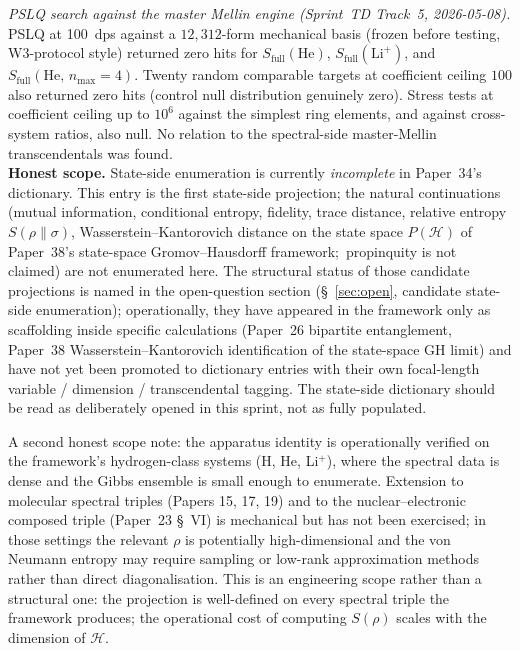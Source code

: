 \documentclass[11pt]{article}
\begin{document}
\textit{PSLQ search against the master Mellin engine (Sprint~TD Track~5,
2026-05-08).}  PSLQ at 100~dps against a $12{,}312$-form mechanical
basis (frozen before testing, W3-protocol style) returned zero hits
for $S_\mathrm{full}(\mathrm{He})$, $S_\mathrm{full}(\mathrm{Li}^+)$,
and $S_\mathrm{full}(\mathrm{He},\, n_{\max}{=}4)$.  Twenty random
comparable targets at coefficient ceiling $100$ also returned zero
hits (control null distribution genuinely zero).  Stress tests at
coefficient ceiling up to $10^6$ against the simplest ring elements,
and against cross-system ratios, also null.  No relation to the
spectral-side master-Mellin transcendentals was found.\\
\textbf{Honest scope.}  State-side enumeration is currently
\emph{incomplete} in Paper~34's dictionary.  This entry is the first
state-side projection; the natural continuations
(mutual information, conditional entropy, fidelity, trace distance,
relative entropy $S(\rho \| \sigma)$, Wasserstein--Kantorovich
distance on the state space $P(\mathcal{H})$ of Paper~38's state-space
Gromov--Hausdorff framework;\ propinquity is not claimed) are not
enumerated here.  The structural status of those
candidate projections is named in the open-question section
(\S~\ref{sec:open}, candidate state-side enumeration); operationally,
they have appeared in the framework only as scaffolding inside
specific calculations (Paper~26 bipartite entanglement, Paper~38
Wasserstein--Kantorovich identification of the state-space GH limit) and
have not yet been promoted to dictionary entries with their own
focal-length variable / dimension / transcendental tagging.  The
state-side dictionary should be read as deliberately opened in this
sprint, not as fully populated.

A second honest scope note: the apparatus identity is operationally
verified on the framework's hydrogen-class systems
(H, He, Li$^+$), where the spectral data is dense and the Gibbs
ensemble is small enough to enumerate.  Extension to molecular
spectral triples (Papers 15, 17, 19) and to the nuclear--electronic
composed triple (Paper~23 \S~VI) is mechanical but has not been
exercised; in those settings the relevant $\rho$ is potentially
high-dimensional and the von Neumann entropy may require sampling
or low-rank approximation methods rather than direct
diagonalisation.  This is an engineering scope rather than a
structural one: the projection is well-defined on every spectral
triple the framework produces; the operational cost of computing
$S(\rho)$ scales with the dimension of $\mathcal{H}$.
\end{document}
